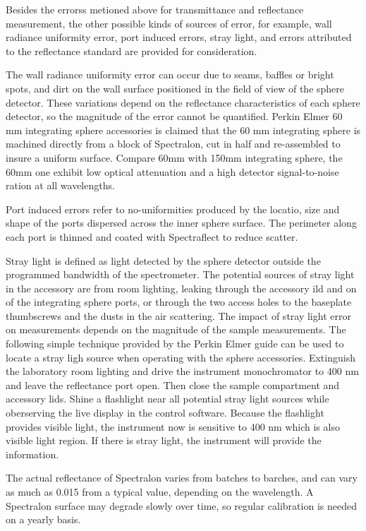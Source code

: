 Besides the errorss metioned above for transmittance and reflectance measurement, the other possible kinds of sources of error, for example,
wall radiance uniformity error, port induced errors, stray light, and errors attributed to the reflectance standard are provided
for consideration.

The wall radiance uniformity error can occur due to seams, baffles or bright spots, and dirt on the wall surface
positioned in the field of view of the sphere detector. These variations depend on the reflectance
characteristics of each sphere detector, so the magnitude of the error cannot be quantified.
Perkin Elmer 60 mm integrating sphere accessories is claimed that the 60 mm integrating sphere is machined
directly from a block of Spectralon, cut in half and
re-assembled to insure a uniform surface. Compare 60mm with 150mm integrating sphere, the 60mm one exhibit low optical
attenuation and a high detector signal-to-noise ration at all wavelengths.

Port induced errors refer to no-uniformities produced by the locatio, size and shape
of the ports dispersed across the inner sphere surface. The perimeter along each
port is thinned and coated with Spectraflect to reduce scatter.

Stray light is defined as light detected by the sphere detector outside the programmed bandwidth of the spectrometer.
The potential sources of stray light in the accessory are from
room lighting, leaking through the accessory ild and on of the integrating sphere ports, or
through the two access holes to the baseplate thumbscrews and the dusts in the air scattering.
The impact of stray light error on measurements depends on the magnitude of the sample measurements.
The following simple technique provided by the Perkin Elmer guide can be used to locate a stray ligh source when operating with
the sphere accessories. Extinguish the laboratory room lighting and drive the instrument monochromator to 400 nm and leave the reflectance port open.
Then close the sample compartment and accessory lids. Shine a flashlight near all potential stray light sources while oberserving the live display in the
control software. Because the flashlight provides visible light, the instrument now is sensitive to 400 nm which is also visible light region. If there is stray light, the instrument will provide the information.

The actual reflectance of Spectralon varies from batches to barches, and can vary as much as 0.015 from a typical value, depending on the wavelength.
A Spectralon surface may degrade slowly over time, so regular calibration is needed on a yearly basis.


